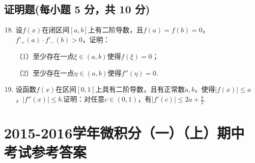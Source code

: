 \documentclass[../main.tex]{subfiles}
\begin{document}
\section{证明题(每小题 5 分，共 10 分)}
\begin{enumerate}
    \setcounter{enumi}{17}
    \item 设$f(x)$在闭区间$[a,b]$上有二阶导数，且$f(a)=f(b)=0$，$f'_{+}(a)\cdot
              f'_{-}(b)>0$，证明：

          （1）至少存在一点$\xi\in(a,b)$使得$f(\xi)=0$；

          （2）至少存在一点$\eta\in(a,b)$使得$f''(\eta)=0$.
          \vspace{10em}

    \item 设函数$f(x)$在区间$[0,1]$上具有二阶导数，且有正常数$a,b$，使得$|f(
              x)|\leq a$，$|f''(x)|\leq b$.证明：对任意$c\in(0,1)$，有$|f'(c)|\leq 2a+\frac{b}{2}$.
          \vspace{10em}
\end{enumerate}

\chapter{2015-2016学年微积分（一）（上）期中考试参考答案}
\end{document}
